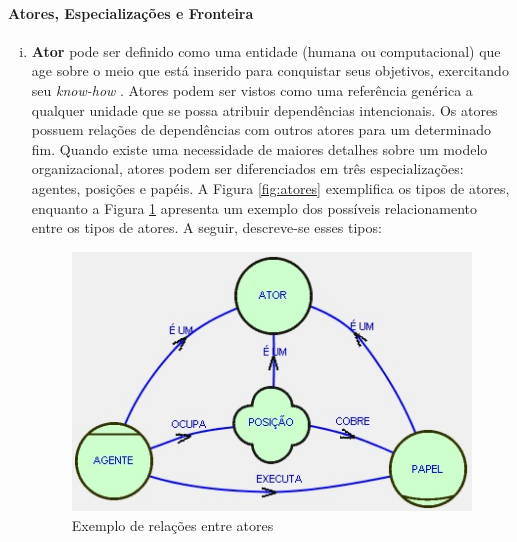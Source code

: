             \paragraph{Atores, Especializações e Fronteira}
                \begin{enumerate}[i.] %
                    \item \textbf{Ator} pode ser definido como uma entidade (humana ou computacional) que age sobre o meio que está inserido para conquistar seus objetivos, exercitando seu \emph{know-how} \cite{yu1995modelling}. Atores podem ser vistos como uma referência genérica a qualquer unidade que se possa atribuir dependências intencionais. Os atores possuem relações de dependências com outros atores para um determinado fim. Quando existe uma necessidade de maiores detalhes sobre um modelo organizacional, atores podem ser diferenciados em três especializações: agentes, posições e papéis. A Figura \ref{fig:atores} exemplifica os tipos de atores, enquanto a Figura \ref{fig:atores-exemplo} apresenta um exemplo dos possíveis relacionamento entre os tipos de atores. A seguir, descreve-se esses tipos:
                    
                    \begin{figure}[h!]
                        \centering
                            \includegraphics[scale=0.8]{Figuras/istar/atores.jpg}
                            \caption{Exemplo de relações entre atores}
                            \label{fig:atores-exemplo}
                    \end{figure}


\end{enumerate}
